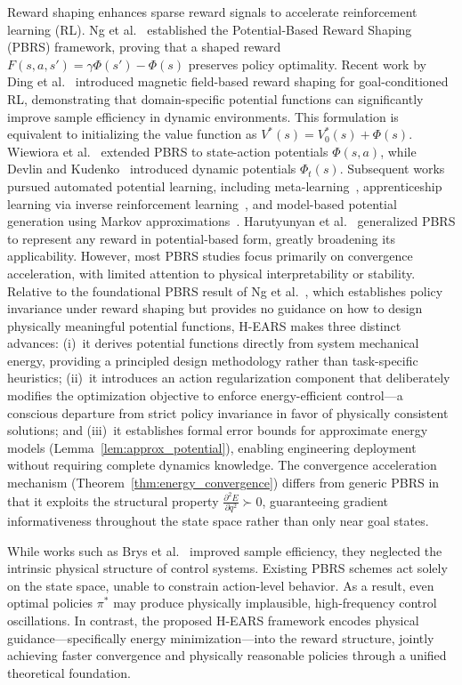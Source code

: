 \documentclass[journal]{IEEEtran}
\begin{document}
	Reward shaping enhances sparse reward signals to accelerate reinforcement learning (RL). Ng et al.~\cite{ng1999policy} established the Potential-Based Reward Shaping (PBRS) framework, proving that a shaped reward $F(s,a,s')=\gamma\Phi(s')-\Phi(s)$ preserves policy optimality. Recent work by Ding et al.~\cite{ding2023magnetic} introduced magnetic field-based reward shaping for goal-conditioned RL, demonstrating that domain-specific potential functions can significantly improve sample efficiency in dynamic environments. This formulation is equivalent to initializing the value function as $V^*(s)=V^*_0(s)+\Phi(s)$. Wiewiora et al.~\cite{wiewiora2003principled} extended PBRS to state-action potentials $\Phi(s,a)$, while Devlin and Kudenko~\cite{devlin2012dynamic} introduced dynamic potentials $\Phi_t(s)$. Subsequent works pursued automated potential learning, including meta-learning~\cite{zou2021reward}, apprenticeship learning via inverse reinforcement learning~\cite{abbeel2004apprenticeship}, and model-based potential generation using Markov approximations~\cite{grzes2010learning}. Harutyunyan et al.~\cite{harutyunyan2015expressing} generalized PBRS to represent any reward in potential-based form, greatly broadening its applicability. However, most PBRS studies focus primarily on convergence acceleration, with limited attention to physical interpretability or stability. Relative to the foundational PBRS result of Ng et al.~\cite{ng1999policy}, which establishes policy invariance under reward shaping but provides no guidance on how to design physically meaningful potential functions, H-EARS makes three distinct advances: (i)~it derives potential functions directly from system mechanical energy, providing a principled design methodology rather than task-specific heuristics; (ii)~it introduces an action regularization component that deliberately modifies the optimization objective to enforce energy-efficient control---a conscious departure from strict policy invariance in favor of physically consistent solutions; and (iii)~it establishes formal error bounds for approximate energy models (Lemma~\ref{lem:approx_potential}), enabling engineering deployment without requiring complete dynamics knowledge. The convergence acceleration mechanism (Theorem~\ref{thm:energy_convergence}) differs from generic PBRS in that it exploits the structural property $\frac{\partial^2 E}{\partial q^2} \succ 0$, guaranteeing gradient informativeness throughout the state space rather than only near goal states.
	
	While works such as Brys et al.~\cite{brys2015} improved sample efficiency, they neglected the intrinsic physical structure of control systems. Existing PBRS schemes act solely on the state space, unable to constrain action-level behavior. As a result, even optimal policies $\pi^*$ may produce physically implausible, high-frequency control oscillations. In contrast, the proposed H-EARS framework encodes physical guidance—specifically energy minimization—into the reward structure, jointly achieving faster convergence and physically reasonable policies through a unified theoretical foundation.
	
\end{document}
